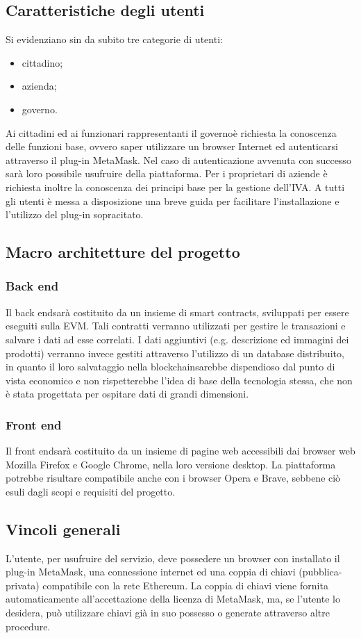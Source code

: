 \subsection{Caratteristiche degli utenti}
Si evidenziano sin da subito tre categorie di utenti:
\begin{itemize}
	\item cittadino;
	\item azienda;
	\item governo\glo.
\end{itemize}
Ai cittadini ed ai funzionari rappresentanti il governo\glosp è richiesta la conoscenza delle funzioni base, ovvero saper utilizzare un browser Internet ed autenticarsi attraverso il plug-in MetaMask\glo. Nel caso di autenticazione avvenuta con successo sarà loro possibile usufruire  della piattaforma. Per i proprietari di aziende è richiesta inoltre la conoscenza dei principi base per la gestione dell'IVA. A tutti gli utenti è messa a disposizione una breve guida per facilitare l'installazione e l'utilizzo del plug-in sopracitato. 

\subsection{Macro architetture del progetto}
\subsubsection{Back end}
Il back end\glosp sarà costituito da un insieme di smart contracts\glo, sviluppati per essere eseguiti sulla EVM\glo. Tali contratti verranno utilizzati per gestire le transazioni e salvare i dati ad esse correlati. I dati aggiuntivi (e.g. descrizione ed immagini dei prodotti) verranno invece gestiti attraverso l'utilizzo di un database distribuito, in quanto il loro salvataggio nella blockchain\glosp sarebbe dispendioso dal punto di vista economico e non rispetterebbe l'idea di base della tecnologia stessa, che non è stata progettata per ospitare dati di grandi dimensioni.

\subsubsection{Front end}
Il front end\glosp sarà costituito da un insieme di pagine web accessibili dai browser web Mozilla Firefox e Google Chrome, nella loro versione desktop. La piattaforma potrebbe risultare compatibile anche con i browser Opera e Brave, sebbene ciò esuli dagli scopi e requisiti del progetto.

\subsection{Vincoli generali}
L’utente, per usufruire del servizio, deve possedere un browser con installato il plug-in MetaMask\glo, una connessione internet ed una coppia di chiavi (pubblica-privata) compatibile con la rete Ethereum\glo. La coppia di chiavi viene fornita automaticamente all'accettazione della licenza di MetaMask\glo, ma, se l’utente lo desidera, può utilizzare chiavi già in suo possesso o generate attraverso altre procedure.

 
